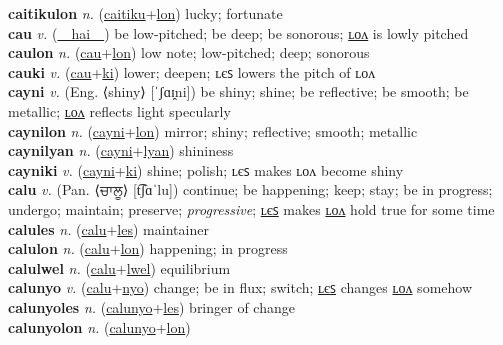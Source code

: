 \textbf{caitikulon} \textit{n.} (\hyperref[caitiku]{caitiku}+\hyperref[lon]{lon})
lucky; fortunate \label{caitikulon} \\
\textbf{cau} \textit{v.} (\hyperref[hai]{~~hai~~})
be low-pitched; be deep; be sonorous; \hyperref[caulon]{ʟᴏᴧ} is lowly pitched \label{cau} \\
\textbf{caulon} \textit{n.} (\hyperref[cau]{cau}+\hyperref[lon]{lon})
low note; low-pitched; deep; sonorous \label{caulon} \\
\textbf{cauki} \textit{v.} (\hyperref[cau]{cau}+\hyperref[ki]{ki})
lower; deepen; ʟєꜱ lowers the pitch of ʟᴏᴧ \label{cauki} \\
\textbf{cayni} \textit{v.} (Eng. ⟨shiny⟩ [ˈʃɑɪ̯ni])
be shiny; shine; be reflective; be smooth; be metallic; \hyperref[caynilon]{ʟᴏᴧ} reflects light specularly \label{cayni} \\
\textbf{caynilon} \textit{n.} (\hyperref[cayni]{cayni}+\hyperref[lon]{lon})
mirror; shiny; reflective; smooth; metallic \label{caynilon} \\
\textbf{caynilyan} \textit{n.} (\hyperref[cayni]{cayni}+\hyperref[lyan]{lyan})
shininess \label{caynilyan} \\
\textbf{cayniki} \textit{v.} (\hyperref[cayni]{cayni}+\hyperref[ki]{ki})
shine; polish; ʟєꜱ makes ʟᴏᴧ become shiny \label{cayniki} \\
\textbf{calu} \textit{v.} (Pan. ⟨ਚਾਲੂ⟩ [t͡ʃɑˈlu])
continue; be happening; keep; stay; be in progress; undergo; maintain; preserve; \textit{progressive}; \hyperref[calules]{ʟєꜱ} makes \hyperref[calulon]{ʟᴏᴧ} hold true for some time \label{calu} \\
\textbf{calules} \textit{n.} (\hyperref[calu]{calu}+\hyperref[les]{les})
maintainer \label{calules} \\
\textbf{calulon} \textit{n.} (\hyperref[calu]{calu}+\hyperref[lon]{lon})
happening; in progress \label{calulon} \\
\textbf{calulwel} \textit{n.} (\hyperref[calu]{calu}+\hyperref[lwel]{lwel})
equilibrium \label{calulwel} \\
\textbf{calunyo} \textit{v.} (\hyperref[calu]{calu}+\hyperref[nyo]{nyo})
change; be in flux; switch; \hyperref[calunyoles]{ʟєꜱ} changes \hyperref[calunyolon]{ʟᴏᴧ} somehow \label{calunyo} \\
\textbf{calunyoles} \textit{n.} (\hyperref[calunyo]{calunyo}+\hyperref[les]{les})
bringer of change \label{calunyoles} \\
\textbf{calunyolon} \textit{n.} (\hyperref[calunyo]{calunyo}+\hyperref[lon]{lon})
